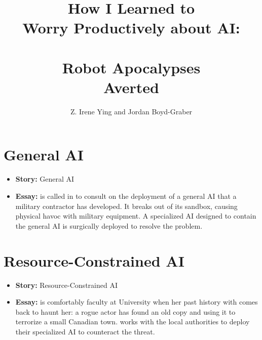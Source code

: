 \documentclass[bfivepaper,twosided,justified,nobib]{tufte-book}
\title{How I Learned to \\ Worry Productively about AI: \\  \\ Robot Apocalypses \\ Averted}
\author{Z. Irene Ying and Jordan Boyd-Graber}
\begin{document}

\frontmatter









%

\newcommand{\outline}[3]{\chapter{#1}
  \begin{itemize}
  \item {\bf Story:} #1
  \item {\bf Essay:} #2
  \end{itemize}
}

\outline{General AI}{\lastname{} is called in to consult on the
  deployment of a general AI that a military contractor has developed.
  It breaks out of its sandbox, causing physical havoc with military
  equipment.  A specialized AI designed to contain the general AI is
  surgically deployed to resolve the problem.}{This chapter explores
  the distinction between general and specialized
  AI---\specializedai{}---and how the pressures and history of a
  general AI cause them to be vulnerable to specialized algorithms and
  methods.}

\outline{Resource-Constrained AI}{\lastname{} is comfortably faculty
  at University when her past history with \specializedai{} comes back
  to haunt her: a rogue actor has found an old copy and using it to
  terrorize a small Canadian town.  \lastname{} works with the local
  authorities to deploy their specialized AI to counteract the
  threat.}{This chapter explores how governments' role as a protector
  of populations and evolves in a world with ubiquitous and powerful
  artifcial intelligence.  Although in some ways AI is democratizing,
  it is still connected to access to real-world resources (material,
  energy, physical space), and governments and multinational
  corporations will have the most powerful and capable AI agents.
  Just as we trust governments with technology that can end the world
  (nuclear weapons), we must trust the government to responsibly
  harness the power of artificial intelligence.}
\end{document}
